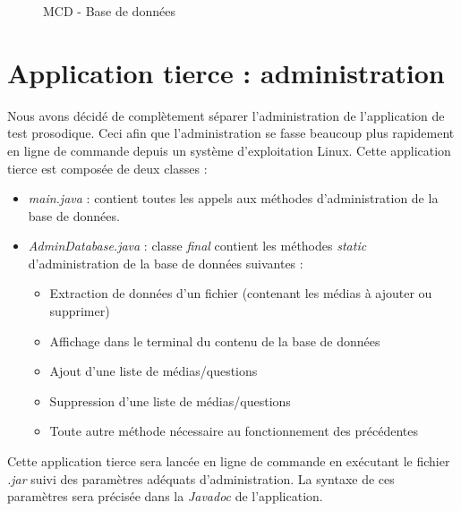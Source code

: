 \begin{figure}[!h]
\begin{center}
  \caption{MCD - Base de données}
  \label{MCD} 
\end{center}
\end{figure}



\section{Application tierce : administration}

Nous avons décidé de complètement séparer l'administration de l'application de test prosodique. Ceci afin que l'administration se fasse beaucoup plus rapidement en ligne de commande depuis un système d'exploitation Linux.
Cette application tierce est composée de deux classes :

\begin{itemize}
 \item \textit{main.java} : contient toutes les appels aux méthodes d'administration de la base de données.
 \item \textit{AdminDatabase.java} : classe \textit{final} contient les méthodes \textit{static} d'administration de la base de données suivantes :
 \begin{itemize} 
  \item Extraction de données d'un fichier (contenant les médias à ajouter ou supprimer)
  \item Affichage dans le terminal du contenu de la base de données
  \item Ajout d'une liste de médias/questions
  \item Suppression d'une liste de médias/questions
  \item Toute autre méthode nécessaire au fonctionnement des précédentes
 \end{itemize}
\end{itemize}


Cette application tierce sera lancée en ligne de commande en exécutant le fichier \textit{.jar} suivi des paramètres adéquats d'administration. La syntaxe de ces paramètres sera précisée dans la \textit{Javadoc} de l'application.
